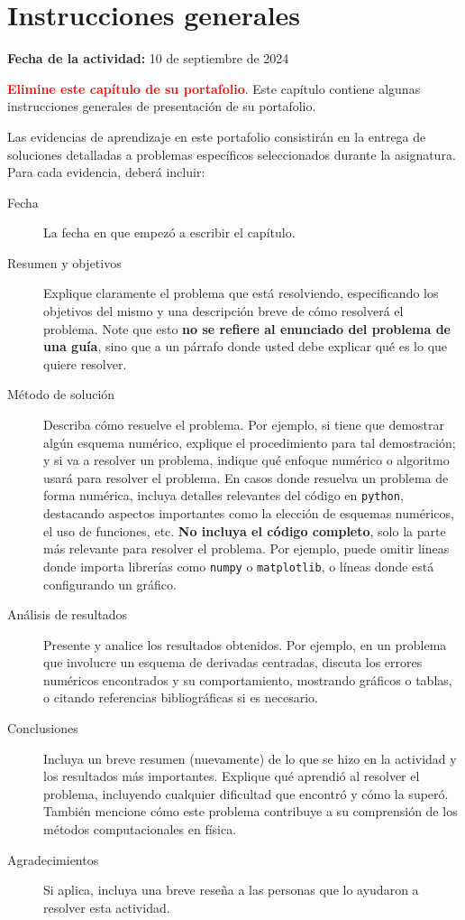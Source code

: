 \documentclass[../portafolio.tex]{subfiles}
\begin{document}
\chapter{Instrucciones generales}
\label{ch:instrucciones}

\hfill \textbf{Fecha de la actividad:} 10 de septiembre de 2024

\medskip

\textcolor{red}{\bf Elimine este capítulo de su portafolio}. Este
capítulo contiene algunas instrucciones generales de presentación de
su portafolio.

Las evidencias de aprendizaje en este portafolio consistirán en la
entrega de soluciones detalladas a problemas específicos seleccionados
durante la asignatura. Para cada evidencia, deberá incluir:

\begin{description}
\item[Fecha] La fecha en que empezó a escribir el capítulo.
\item[Resumen y objetivos] Explique claramente el problema que está resolviendo,
  especificando los objetivos del mismo y una descripción breve de
  cómo resolverá el problema. Note que esto \textbf{no se refiere al
    enunciado del problema de una guía}, sino que a un párrafo donde
  usted debe explicar qué es lo que quiere resolver.
\item[Método de solución] Describa cómo resuelve el problema. Por
  ejemplo, si tiene que demostrar algún esquema numérico, explique el
  procedimiento para tal demostración; y si va a resolver un problema,
  indique qué enfoque numérico o algoritmo usará para resolver el
  problema. En casos donde resuelva un problema de forma numérica,
  incluya detalles relevantes del código en \texttt{python},
  destacando aspectos importantes como la elección de esquemas
  numéricos, el uso de funciones, etc. \textbf{No incluya el código
    completo}, solo la parte más relevante para resolver el
  problema. Por ejemplo, puede omitir lineas donde importa librerías
  como \texttt{numpy} o \texttt{matplotlib}, o líneas donde está
  configurando un gráfico.

\item[Análisis de resultados] Presente y analice los resultados
  obtenidos. Por ejemplo, en un problema que involucre un esquema de
  derivadas centradas, discuta los errores numéricos encontrados y su
  comportamiento, mostrando gráficos o tablas, o citando referencias
  bibliográficas si es necesario.

\item[Conclusiones] Incluya un breve resumen (nuevamente) de lo que se
  hizo en la actividad y los resultados más importantes. Explique qué
  aprendió al resolver el problema, incluyendo cualquier dificultad
  que encontró y cómo la superó. También mencione cómo este problema
  contribuye a su comprensión de los métodos computacionales en
  física.

\item[Agradecimientos] Si aplica, incluya una breve reseña a las
  personas que lo ayudaron a resolver esta actividad.
\end{description}
\end{document}

